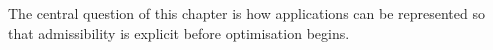 The central question of this chapter is how applications can be represented so that admissibility is explicit before optimisation begins.

